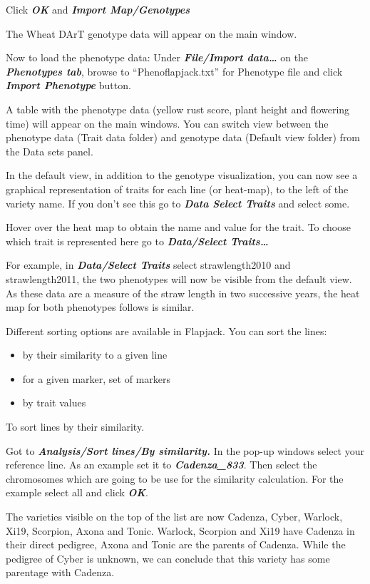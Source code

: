 \documentclass[
]{book}
\providecommand{\tightlist}{%
  \setlength{\itemsep}{0pt}\setlength{\parskip}{0pt}}
\begin{document}
Click \textbf{\emph{OK}} and \textbf{\emph{Import Map/Genotypes}}

The Wheat DArT genotype data will appear on the main window.

Now to load the phenotype data:
Under \textbf{\emph{File/Import data\ldots{}}} on the \textbf{\emph{Phenotypes tab}}, browse to ``Phenoflapjack.txt'' for Phenotype file and click \textbf{\emph{Import Phenotype}} button.

A table with the phenotype data (yellow rust score, plant height and flowering time) will appear on the main windows. You can switch view between the phenotype data (Trait data folder) and genotype data (Default view folder) from the Data sets panel.

In the default view, in addition to the genotype visualization, you can now see a graphical representation of traits for each line (or heat-map), to the left of the variety name. If you don't see this go to \textbf{\emph{Data Select Traits}} and select some.

Hover over the heat map to obtain the name and value for the trait. To choose which trait is represented here go to \textbf{\emph{Data/Select Traits\ldots{}}}

For example, in \textbf{\emph{Data/Select Traits}} select strawlength2010 and strawlength2011, the two phenotypes will now be visible from the default view. As these data are a measure of the straw length in two successive years, the heat map for both phenotypes follows is similar.

Different sorting options are available in Flapjack. You can sort the lines:

\begin{itemize}
\tightlist
\item
  by their similarity to a given line
\item
  for a given marker, set of markers
\item
  by trait values
\end{itemize}

To sort lines by their similarity.

Got to \textbf{\emph{Analysis/Sort lines/By similarity.}} In the pop-up windows select your reference line. As an example set it to \textbf{\emph{Cadenza\_833}}. Then select the chromosomes which are going to be use for the similarity calculation. For the example select all and click \textbf{\emph{OK}}.

The varieties visible on the top of the list are now Cadenza, Cyber, Warlock, Xi19, Scorpion, Axona and Tonic. Warlock, Scorpion and Xi19 have Cadenza in their direct pedigree, Axona and Tonic are the parents of Cadenza. While the pedigree of Cyber is unknown, we can conclude that this variety has some parentage with Cadenza.
\end{document}
